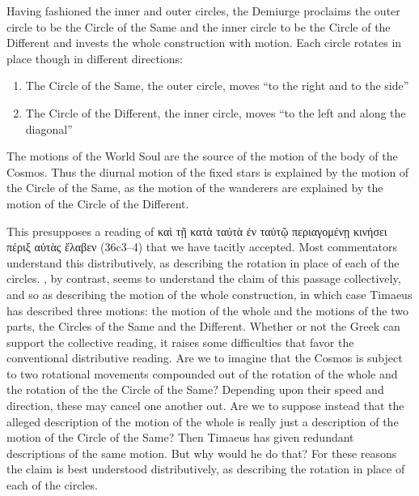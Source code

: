 Having fashioned the inner and outer circles, the Demiurge proclaims the outer circle to be the Circle of the Same and the inner circle to be the Circle of the Different and invests the whole construction with motion. Each circle rotates in place though in different directions:
\begin{enumerate}[(1)]
	\item The Circle of the Same, the outer circle, moves ``to the right and to the side''
	\item The Circle of the Different, the inner circle, moves ``to the left and along the diagonal''
\end{enumerate}
The motions of the World Soul are the source of the motion of the body of the Cosmos. Thus the diurnal motion of the fixed stars is explained by the motion of the Circle of the Same, as the motion of the wanderers are explained by the motion of the Circle of the Different.

This presupposes a reading of {\sbl καὶ τῇ κατὰ ταὐτὰ ἐν ταὐτῷ περιαγομένῃ κινήσει πέριξ αὐτὰς ἔλαβεν} (36c3--4) that we have tacitly accepted. Most commentators understand this distributively, as describing the rotation in place of each of the circles. \citet[112 n2]{Archer-Hind:1888qd}, by contrast, seems to understand the claim of this passage collectively, and so as describing the motion of the whole construction, in which case Timaeus has described three motions: the motion of the whole and the motions of the two parts, the Circles of the Same and the Different. Whether or not the Greek can support the collective reading, it raises some difficulties that favor the conventional distributive reading. Are we to imagine that the Cosmos is subject to two rotational movements compounded out of the rotation of the whole and the rotation of the the Circle of the Same? Depending upon their speed and direction, these may cancel one another out. Are we to suppose instead that the alleged description of the motion of the whole is really just a description of the motion of the Circle of the Same? Then Timaeus has given redundant descriptions of the same motion. But why would he do that? For these reasons the claim is best understood distributively, as describing the rotation in place of each of the circles.

